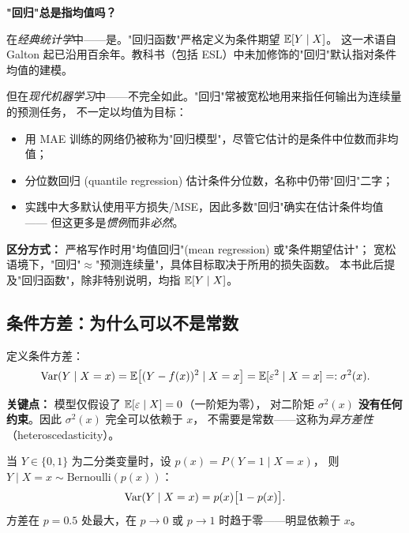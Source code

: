 \begin{remark}
\textbf{"回归"总是指均值吗？}

在\emph{经典统计学}中——是。"回归函数"严格定义为条件期望 $\mathbb{E}[Y \mid X]$。
这一术语自 Galton 起已沿用百余年。教科书（包括 ESL）中未加修饰的"回归"默认指对条件均值的建模。

但在\emph{现代机器学习}中——不完全如此。"回归"常被宽松地用来指任何输出为连续量的预测任务，
不一定以均值为目标：
\begin{itemize}
    \item 用 MAE 训练的网络仍被称为"回归模型"，尽管它估计的是条件中位数而非均值；
    \item 分位数回归 (quantile regression) 估计条件分位数，名称中仍带"回归"二字；
    \item 实践中大多默认使用平方损失/MSE，因此多数"回归"确实在估计条件均值——
    但这更多是\emph{惯例}而非\emph{必然}。
\end{itemize}

\textbf{区分方式：} 严格写作时用"均值回归"(mean regression) 或"条件期望估计"；
宽松语境下，"回归"$\approx$"预测连续量"，具体目标取决于所用的损失函数。
本书此后提及"回归函数"，除非特别说明，均指 $\mathbb{E}[Y \mid X]$。
\end{remark}

\subsection{条件方差：为什么可以不是常数}

定义条件方差：
\begin{equation}\label{eq:cond-var}
    \mathrm{Var}(Y \mid X = x) 
    = \mathbb{E}\big[(Y - f(x))^2 \mid X = x\big]
    = \mathbb{E}[\varepsilon^2 \mid X = x]
    =: \sigma^2(x).
\end{equation}

\textbf{关键点：} 模型仅假设了 $\mathbb{E}[\varepsilon \mid X] = 0$（一阶矩为零），
对二阶矩 $\sigma^2(x)$ \textbf{没有任何约束}。因此 $\sigma^2(x)$ 完全可以依赖于 $x$，
不需要是常数——这称为\emph{异方差性}（heteroscedasticity）。

\begin{example}[二分类问题的条件方差]
当 $Y \in \{0, 1\}$ 为二分类变量时，设 $p(x) = P(Y = 1 \mid X = x)$，
则 $Y \mid X = x \sim \mathrm{Bernoulli}(p(x))$：
\begin{equation}
    \mathrm{Var}(Y \mid X = x) = p(x)\big[1 - p(x)\big].
\end{equation}
方差在 $p = 0.5$ 处最大，在 $p \to 0$ 或 $p \to 1$ 时趋于零——明显依赖于 $x$。
\end{example}

